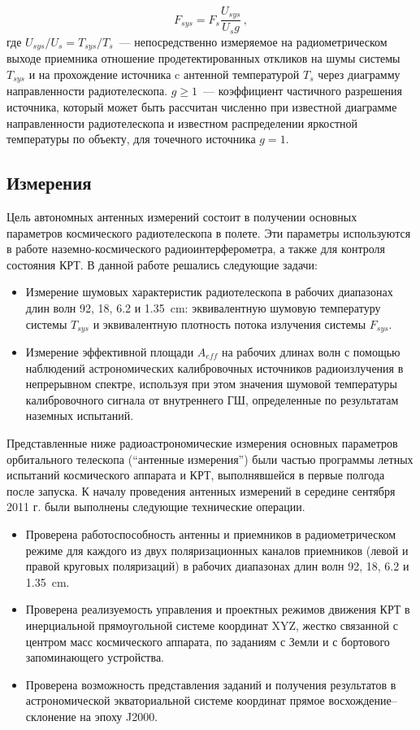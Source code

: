 \begin{equation}
 F_{sys}  = F_s \frac{U_{sys}}{U_s g} \,,
\end{equation}
где $U_{sys}/U_s = T_{sys}/T_s$~--- непосредственно измеряемое на радиометрическом выходе
приемника отношение продетектированных откликов на шумы
системы $T_{sys}$ и на прохождение источника c антенной температурой $T_s$ через диаграмму
направленности радиотелескопа. $g \geqslant 1$~--- коэффициент частичного разрешения источника,
который может быть рассчитан численно при известной диаграмме направленности радиотелескопа
и известном распределении яркостной температуры по объекту, для точечного источника $g = 1$.

\subsection{Измерения}

Цель автономных антенных измерений состоит
в получении основных параметров космического радиотелескопа в полете. Эти параметры используются в
работе наземно-космического радиоинтерферометра, а также для контроля состояния КРТ.
В данной работе решались следующие задачи:

\begin{itemize}
 \item Измерение шумовых характеристик радиотелескопа в рабочих диапазонах длин волн 92, 18,
6.2 и \SI{1.35}{\cm}: эквивалентную шумовую температуру системы $T_{sys}$ и эквивалентную плотность
потока излучения системы $F_{sys}$.
 \item Измерение эффективной площади $A_{eff}$ на
рабочих длинах волн с помощью наблюдений астрономических калибровочных источников радиоизлучения в
непрерывном спектре, используя при этом значения шумовой температуры калибровочного сигнала от
внутреннего ГШ, определенные по результатам наземных испытаний.
\end{itemize}

Представленные ниже радиоастрономические
измерения основных параметров орбитального телескопа (``антенные измерения'') были частью программы
летных испытаний космического аппарата
и КРТ, выполнявшейся в первые полгода после
запуска. К началу проведения антенных
измерений в середине сентября 2011 г. были
выполнены следующие технические операции.

\begin{itemize}
 \item Проверена работоспособность антенны и
приемников в радиометрическом режиме для каждого из двух поляризационных каналов приемников
(левой и правой круговых поляризаций) в рабочих диапазонах длин волн 92, 18, 6.2 и \SI{1.35}{\cm}.
 \item Проверена реализуемость управления и проектных режимов движения КРТ в инерциальной
прямоугольной системе координат XYZ, жестко связанной с центром масс космического аппарата,
по заданиям с Земли и с бортового запоминающего устройства.
 \item  Проверена возможность представления заданий и получения результатов в астрономической
экваториальной системе координат прямое восхождение--склонение на эпоху J2000.
\end{itemize}

